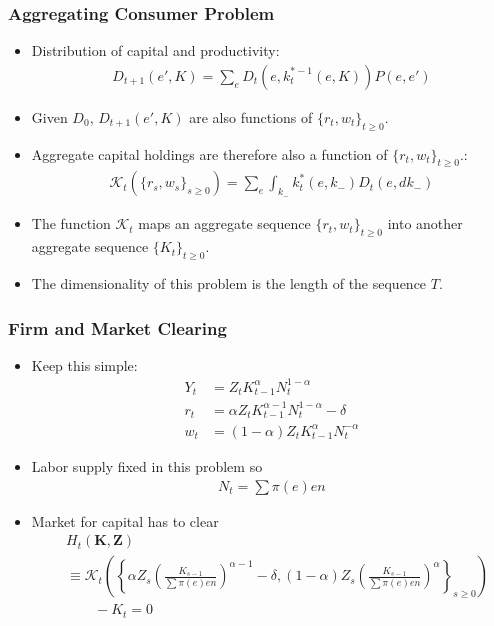 \documentclass[english,xcolor=svgnames]{beamer}
\begin{document}
\begin{frame}
    \frametitle{Aggregating Consumer Problem}
    \begin{itemize}
        \item Distribution of capital and productivity:
        \begin{align*}
        	D_{t+1}(e',K) = \sum_e D_t(e,k_t^{*-1}(e,K))P(e,e')
        \end{align*}
        \item Given $D_0$, $D_{t+1}(e',K)$ are also functions of $\{r_t,w_t\}_{t\ge 0 }$.
        \item Aggregate capital holdings are therefore also a function of $\{r_t,w_t\}_{t\ge 0 }$.:
        \begin{align*}
        	\mathcal{K}_t(\{r_s,w_s\}_{s\ge 0 }) = \sum_e \int_{k_{-}} k_t^*(e,k_{-}) D_t(e,dk_{-})
        \end{align*}
        \item The function $\mathcal{K}_t$ maps an aggregate sequence $\{r_t,w_t\}_{t\ge 0 }$ into another aggregate sequence $\{K_t\}_{t\ge 0}$.
        \item The dimensionality of this problem is the length of the sequence $T$.
	\end{itemize}
\end{frame}


\begin{frame}
    \frametitle{Firm and Market Clearing}
    \begin{itemize}
        \item Keep this simple:
        \begin{align*}
        	Y_t &= Z_t K_{t-1}^{\alpha} N_t^{1-\alpha} \\
        	 r_t &= \alpha  Z_t K_{t-1}^{\alpha-1} N_t^{1-\alpha} - \delta \\
        	 w_t &= (1-\alpha) Z_t K_{t-1}^{\alpha} N_t^{-\alpha}
        \end{align*}
        \item Labor supply fixed in this problem so
        \begin{align*}
        	N_t = \sum \pi(e) en
        \end{align*}
        \item Market for capital has to clear
        \begin{align*}
        	&H_t(\bm{K},\bm{Z})  \\
        	&\equiv \mathcal{K}_t\left(\left\{\alpha  Z_s \left(\frac{K_{s-1}}{\sum \pi(e) en}\right)^{\alpha-1} - \delta,(1-\alpha) Z_s \left(\frac{K_{s-1}}{\sum \pi(e) en}\right)^{\alpha}\right\}_{s\ge 0 } \right)\\
        	&\qquad  - K_t = 0
        \end{align*}
	\end{itemize}
\end{frame}
\end{document}
